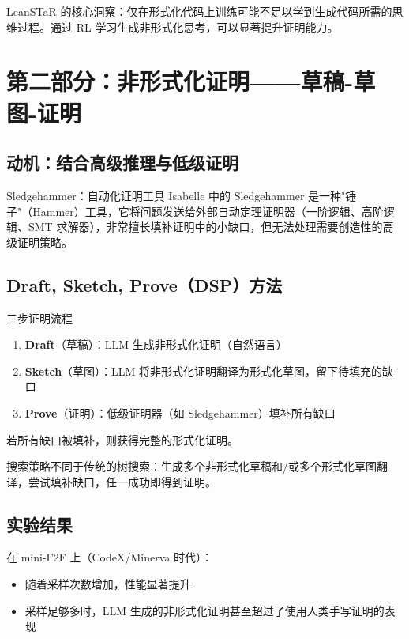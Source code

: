 \documentclass[a4paper]{article}
\begin{document}
LeanSTaR 的核心洞察：仅在形式化代码上训练可能不足以学到生成代码所需的思维过程。通过 RL 学习生成非形式化思考，可以显著提升证明能力。

\section{第二部分：非形式化证明——草稿-草图-证明}

\subsection{动机：结合高级推理与低级证明}

\begin{knowledgebox}{Sledgehammer：自动化证明工具}
Isabelle 中的 Sledgehammer 是一种"锤子"（Hammer）工具，它将问题发送给外部自动定理证明器（一阶逻辑、高阶逻辑、SMT 求解器），非常擅长填补证明中的小缺口，但无法处理需要创造性的高级证明策略。
\end{knowledgebox}

\subsection{Draft, Sketch, Prove（DSP）方法}

\begin{importantbox}{三步证明流程}
\begin{enumerate}
    \item \textbf{Draft}（草稿）：LLM 生成非形式化证明（自然语言）
    \item \textbf{Sketch}（草图）：LLM 将非形式化证明翻译为形式化草图，留下待填充的缺口
    \item \textbf{Prove}（证明）：低级证明器（如 Sledgehammer）填补所有缺口
\end{enumerate}
若所有缺口被填补，则获得完整的形式化证明。
\end{importantbox}

搜索策略不同于传统的树搜索：生成多个非形式化草稿和/或多个形式化草图翻译，尝试填补缺口，任一成功即得到证明。

\subsection{实验结果}

在 mini-F2F 上（CodeX/Minerva 时代）：
\begin{itemize}
    \item 随着采样次数增加，性能显著提升
    \item 采样足够多时，LLM 生成的非形式化证明甚至超过了使用人类手写证明的表现
\end{itemize}
\end{document}
